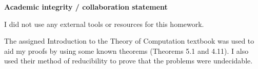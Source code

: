 
\noindent \textbf{Academic integrity / collaboration statement}

\vskip 0.3in

\noindent I did not use any external tools or resources for this homework.

\vskip 0.1in

\noindent The assigned Introduction to the Theory of Computation textbook was used to aid my proofs by using some
known theorems (Theorems 5.1 and 4.11). I also used their method of reducibility to prove that the problems were 
undecidable.